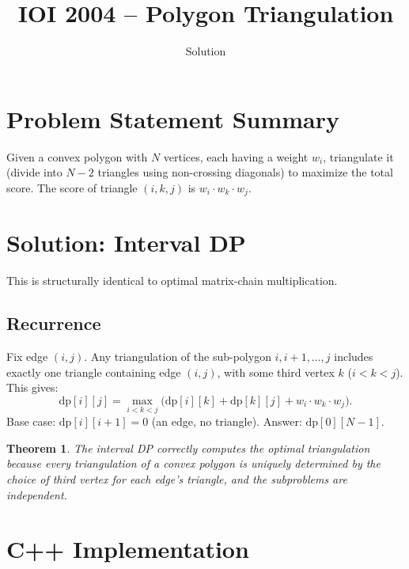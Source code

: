 \documentclass[11pt,a4paper]{article}
\title{IOI 2004 -- Polygon Triangulation}
\author{Solution}
\date{}
\newtheorem{theorem}{Theorem}
\begin{document}
\maketitle

\section{Problem Statement Summary}
Given a convex polygon with $N$ vertices, each having a weight $w_i$,
triangulate it (divide into $N - 2$ triangles using non-crossing
diagonals) to maximize the total score. The score of triangle
$(i, k, j)$ is $w_i \cdot w_k \cdot w_j$.

\section{Solution: Interval DP}

This is structurally identical to optimal matrix-chain multiplication.

\subsection{Recurrence}
Fix edge $(i, j)$. Any triangulation of the sub-polygon
$i, i{+}1, \ldots, j$ includes exactly one triangle containing edge
$(i, j)$, with some third vertex $k$ ($i < k < j$). This gives:
\[
  \mathrm{dp}[i][j] = \max_{i < k < j}
  \bigl(\mathrm{dp}[i][k] + \mathrm{dp}[k][j] + w_i \cdot w_k \cdot w_j\bigr).
\]
Base case: $\mathrm{dp}[i][i{+}1] = 0$ (an edge, no triangle).
Answer: $\mathrm{dp}[0][N{-}1]$.

\begin{theorem}
The interval DP correctly computes the optimal triangulation because
every triangulation of a convex polygon is uniquely determined by the
choice of third vertex for each edge's triangle, and the subproblems
are independent.
\end{theorem}

\section{C++ Implementation}
\end{document}
